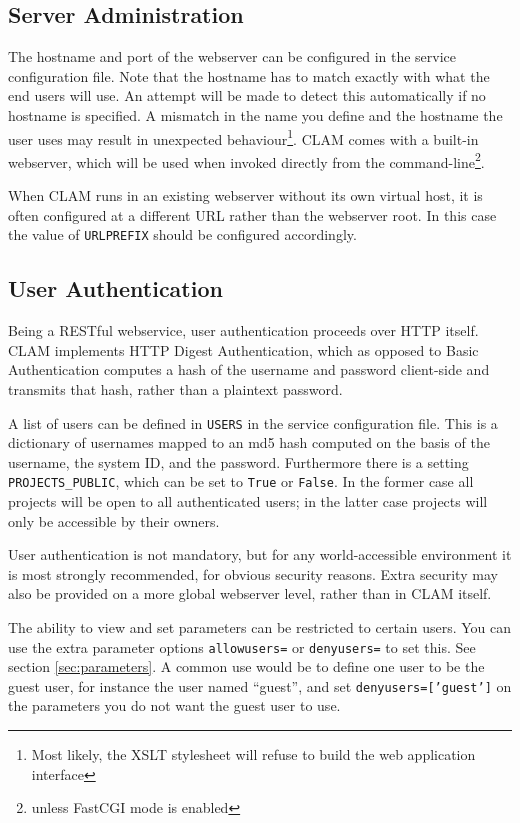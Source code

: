 \documentclass[a4paper,12pt]{report}
\begin{document}
\subsection{Server Administration}
\label{sec:sadmin}

The hostname and port of the webserver can be configured in the service configuration file. Note that the hostname has to match exactly with what the end users will use. An attempt will be made to detect this automatically if no hostname is specified. A mismatch in the name you define and the hostname the user uses may result in unexpected behaviour\footnote{Most likely, the XSLT stylesheet will refuse to build the web application interface}. CLAM comes with a built-in webserver, which will be used when invoked directly from the command-line\footnote{unless FastCGI mode is enabled}.

When CLAM runs in an existing webserver without its own virtual host, it is often configured at a different URL rather than the webserver root. In this case the value of \texttt{URLPREFIX} should be configured accordingly.

\subsection{User Authentication}

Being a RESTful webservice, user authentication proceeds over HTTP itself. CLAM implements HTTP Digest Authentication, which as opposed to Basic Authentication computes a hash of the username and password client-side and transmits that hash, rather than a plaintext password. 

A list of users can be defined in \texttt{USERS} in the service configuration file. This is a dictionary of usernames mapped to an md5 hash computed on the basis of the username, the system ID, and the password. Furthermore there is a setting \texttt{PROJECTS\_PUBLIC}, which can be set to \texttt{True} or \texttt{False}. In the former case all projects will be open to all authenticated users; in the latter case projects will only be accessible by their owners.

User authentication is not mandatory, but for any world-accessible environment it is most strongly recommended, for obvious security reasons. Extra security may also be provided on a more global webserver level, rather than in CLAM itself.

The ability to view and set parameters can be restricted to certain users. You can use the extra parameter options \texttt{allowusers=} or \texttt{denyusers=} to set this. See section \ref{sec:parameters}. A common use would be to define one user to be the guest user, for instance the user named ``guest'', and set \texttt{denyusers=['guest']} on the parameters you do not want the guest user to use.
\end{document}

